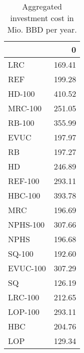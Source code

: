 \begin{table}
\centering
\caption{Aggregated investment cost in Mio. BBD per year.}
\label{tab:agg_invest_cost}
\begin{tabular}{lr}
\toprule
{} &      0 \\
\midrule
LRC      & 169.41 \\
REF      & 199.28 \\
HD-100   & 410.52 \\
MRC-100  & 251.05 \\
RB-100   & 355.99 \\
EVUC     & 197.97 \\
RB       & 197.27 \\
HD       & 246.89 \\
REF-100  & 293.11 \\
HBC-100  & 393.78 \\
MRC      & 196.69 \\
NPHS-100 & 307.66 \\
NPHS     & 196.68 \\
SQ-100   & 192.60 \\
EVUC-100 & 307.29 \\
SQ       & 126.19 \\
LRC-100  & 212.65 \\
LOP-100  & 293.11 \\
HBC      & 204.76 \\
LOP      & 129.34 \\
\bottomrule
\end{tabular}
\end{table}
